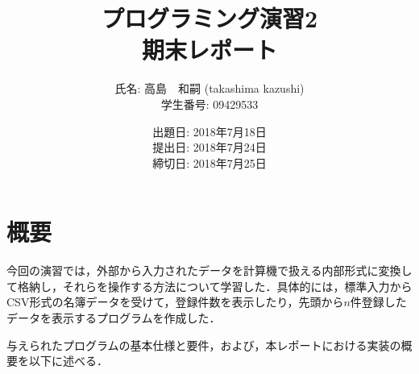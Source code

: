 \documentclass[a4j,11pt]{jarticle}
\title{プログラミング演習2 \\
       期末レポート}
\author{氏名: 高島　和嗣 (takashima kazushi) \\
        学生番号: 09429533}
\date{出題日: 2018年7月18日 \\
      提出日: 2018年7月24日 \\
      締切日: 2018年7月25日 \\}
\begin{document}
\maketitle

{\footnotesize \tableofcontents \newpage}

\section{概要}
今回の演習では，外部から入力されたデータを計算機で扱える内部形式に変換して格納し，それらを操作する方法について学習した．具体的には，標準入力からCSV形式の名簿データを受けて，登録件数を表示したり，先頭から$n$件登録したデータを表示するプログラムを作成した．

与えられたプログラムの基本仕様と要件，および，本レポートにおける実装の概要を以下に述べる．
\end{document}
